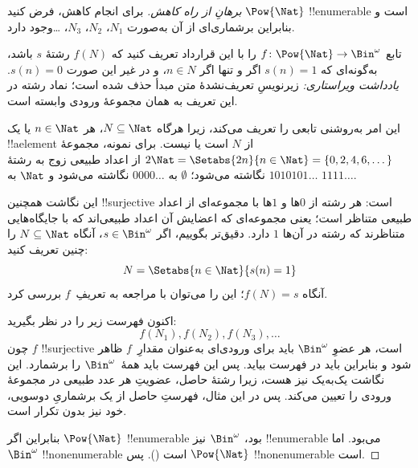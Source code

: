 \documentclass[../../../include/open-logic-section]{subfiles}
\begin{document}
\begin{proof}[برهانِ {} از راه کاهش]
برای انجام کاهش، فرض کنید $\Pow{\Nat}$ !!{enumerable} است و بنابراین
برشماری‌ای از آن به‌صورت $N_{1}$، $N_{2}$، $N_{3}$، \dots وجود دارد.

تابع $f \colon \Pow{\Nat} \to \Bin^\omega$ را با این قرارداد تعریف
کنید که $f(N)$ رشتهٔ $s$ باشد، به‌گونه‌ای که $s(n) = 1$ اگر و تنها
اگر $n \in N$، و در غیر این صورت $s(n) = 0$.
\emph{یادداشت ویراستاری:} زیرنویسِ تعریف‌نشدهٔ متن مبدأ حذف شده است؛
نماد رشته در این تعریف به همان مجموعهٔ ورودی وابسته است.

این امر به‌روشنی تابعی را تعریف می‌کند، زیرا هرگاه $N \subseteq \Nat$،
هر $n \in \Nat$ یا یک !!a{element} از $N$ است یا نیست. برای نمونه،
مجموعهٔ $2\Nat = \Setabs{2n}{n \in \Nat} = \{0,2, 4, 6,
\dots\}$ از اعداد طبیعی زوج به رشتهٔ $1010101\dots$ نگاشته می‌شود؛
$\emptyset$ به $0000\dots$ نگاشته می‌شود و $\Nat$ به
$1111\dots$.

این نگاشت همچنین !!{surjective} است: هر رشته از $0$ها و $1$ها با
مجموعه‌ای از اعداد طبیعی متناظر است؛ یعنی مجموعه‌ای که اعضایش آن اعداد
طبیعی‌اند که با جایگاه‌هایی متناظرند که رشته در آن‌ها $1$ دارد. دقیق‌تر
بگوییم، اگر $s \in \Bin^\omega$، آنگاه $N
\subseteq \Nat$ را چنین تعریف کنید:
\[
N = \Setabs{n \in \Nat}{s(n) = 1}
\]
آنگاه $f(N) = s$؛ این را می‌توان با مراجعه به تعریفِ~$f$ بررسی کرد.

اکنون فهرست زیر را در نظر بگیرید:
\[
f(N_1), f(N_2), f(N_3), \dots
\]
چون $f$ !!{surjective} است، هر عضوِ $\Bin^\omega$ باید برای ورودی‌ای
به‌عنوان مقدارِ~$f$ ظاهر شود و بنابراین باید در فهرست بیاید. پس این
فهرست باید همهٔ~$\Bin^\omega$ را برشمارد.
این نگاشت یک‌به‌یک نیز هست، زیرا رشتهٔ حاصل، عضویتِ هر عدد طبیعی در
مجموعهٔ ورودی را تعیین می‌کند. پس در این مثال، فهرستِ حاصل از یک
برشماریِ دوسویی، خود نیز بدون تکرار است.

بنابراین اگر $\Pow{\Nat}$ !!{enumerable} بود، $\Bin^\omega$ نیز
!!{enumerable} می‌بود. اما $\Bin^\omega$ !!{nonenumerable} است
(). پس $\Pow{\Nat}$
!!{nonenumerable} است.
\end{proof}

\end{document}
